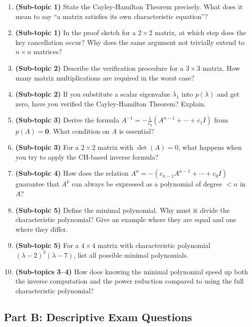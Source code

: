 \documentclass[12pt,a4paper]{article}
\begin{document}
\begin{enumerate}
  \item \textbf{(Sub-topic 1)} State the Cayley-Hamilton Theorem precisely.
        What does it mean to say ``a matrix satisfies its own characteristic equation''?
  \item \textbf{(Sub-topic 1)} In the proof sketch for a $2\times2$ matrix, at which
        step does the key cancellation occur? Why does the same argument not trivially
        extend to $n\times n$ matrices?
  \item \textbf{(Sub-topic 2)} Describe the verification procedure for a $3\times3$ matrix.
        How many matrix multiplications are required in the worst case?
  \item \textbf{(Sub-topic 2)} If you substitute a scalar eigenvalue $\lambda_1$ into $p(\lambda)$
        and get zero, have you verified the Cayley-Hamilton Theorem? Explain.
  \item \textbf{(Sub-topic 3)} Derive the formula $A^{-1} = -\tfrac{1}{c_0}(A^{n-1}+\cdots+c_1 I)$
        from $p(A) = \mathbf{0}$. What condition on $A$ is essential?
  \item \textbf{(Sub-topic 3)} For a $2\times2$ matrix with $\det(A)=0$, what happens when
        you try to apply the CH-based inverse formula?
  \item \textbf{(Sub-topic 4)} How does the relation $A^{n} = -(c_{n-1}A^{n-1}+\cdots+c_0 I)$
        guarantee that $A^{k}$ can always be expressed as a polynomial of degree $< n$ in $A$?
  \item \textbf{(Sub-topic 5)} Define the minimal polynomial. Why must it divide the characteristic
        polynomial? Give an example where they are equal and one where they differ.
  \item \textbf{(Sub-topic 5)} For a $4\times4$ matrix with characteristic polynomial
        $(\lambda-2)^{3}(\lambda-7)$, list all possible minimal polynomials.
  \item \textbf{(Sub-topics 3--4)} How does knowing the minimal polynomial speed up
        both the inverse computation and the power reduction compared to using the
        full characteristic polynomial?
\end{enumerate}

\subsection*{Part B: Descriptive Exam Questions}
\end{document}
